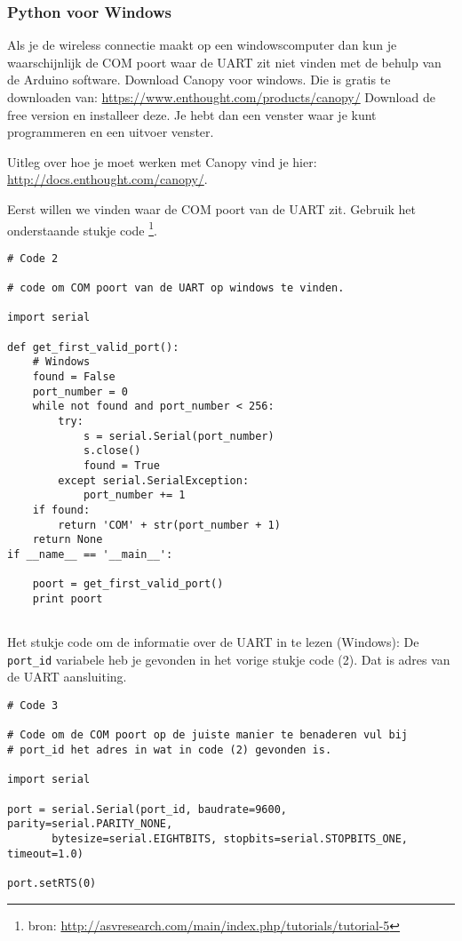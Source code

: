 \subsubsection{Python voor Windows}

Als je de wireless connectie maakt op een windowscomputer dan kun je 
waarschijnlijk de COM poort waar de UART zit niet vinden met de behulp van de 
Arduino software. Download Canopy voor windows.
Die is gratis te downloaden van: \url{https://www.enthought.com/products/canopy/}
Download de free version en installeer deze. Je hebt dan een venster waar je kunt
programmeren en een uitvoer venster.

Uitleg over hoe je moet werken met Canopy vind je hier:
\url{http://docs.enthought.com/canopy/}.

Eerst willen we vinden waar de COM poort van de UART zit. Gebruik het onderstaande 
stukje code \footnote{bron: \url{http://asvresearch.com/main/index.php/tutorials/tutorial-5}}.

\begin{verbatim}
# Code 2

# code om COM poort van de UART op windows te vinden.

import serial
 
def get_first_valid_port():
    # Windows
    found = False
    port_number = 0
    while not found and port_number < 256:
        try:
            s = serial.Serial(port_number)
            s.close()
            found = True
        except serial.SerialException:
            port_number += 1
    if found:
        return 'COM' + str(port_number + 1)
    return None
if __name__ == '__main__': 

    poort = get_first_valid_port()
    print poort
    
\end{verbatim}

Het stukje code om de informatie over de UART in te lezen (Windows):
De \verb|port_id| variabele heb je gevonden in het vorige stukje code (2).
Dat is adres van de UART aansluiting.

\begin{verbatim}
# Code 3

# Code om de COM poort op de juiste manier te benaderen vul bij 
# port_id het adres in wat in code (2) gevonden is.

import serial 

port = serial.Serial(port_id, baudrate=9600, parity=serial.PARITY_NONE, 
       bytesize=serial.EIGHTBITS, stopbits=serial.STOPBITS_ONE, timeout=1.0) 

port.setRTS(0)

\end{verbatim}

